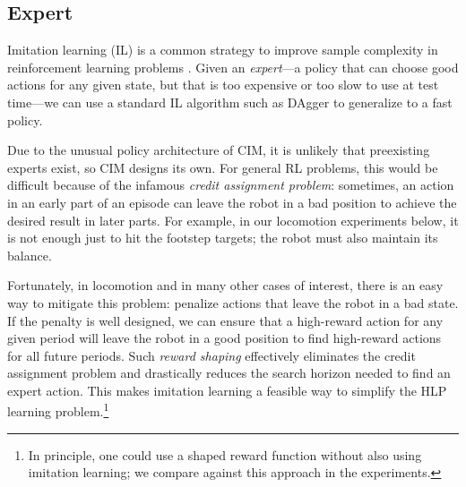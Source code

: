 \documentclass[conference]{IEEEtran}
\begin{document}
\subsection{Expert} \label{sec:expert}

Imitation learning (IL) is a common strategy to improve sample complexity in reinforcement learning problems \citep{osa2018algorithmic}.
Given an \emph{expert}---a policy that can choose good actions for any given state, but that is too expensive or too slow to use at test time---we can use
a standard IL algorithm such as DAgger \citep{ross2011reduction} to generalize to a fast policy.

Due to the unusual policy architecture of CIM, it is unlikely that preexisting experts exist,
so CIM designs its own.
For general RL problems, this would be difficult because of the infamous \emph{credit assignment problem}:
sometimes, an action in an early part of an episode can leave the robot in a bad position to achieve the desired result in later parts.
For example, in our locomotion experiments below, it is not enough just to hit the footstep targets; the robot must also maintain its balance.

Fortunately, in locomotion and in many other cases of interest, there is an easy way to mitigate this problem: penalize actions that leave the robot in a bad state.
If the penalty is well designed, we can ensure that a high-reward action for any given period will leave the robot in a good position to find high-reward actions for all future periods.
Such \emph{reward shaping} effectively eliminates the credit assignment problem and drastically reduces the search horizon needed to find an expert action.
This makes imitation learning a feasible way to simplify the HLP learning problem.\footnote{
In principle, one could use a shaped reward function without also using imitation learning; we compare against this approach in the experiments.}
\end{document}
